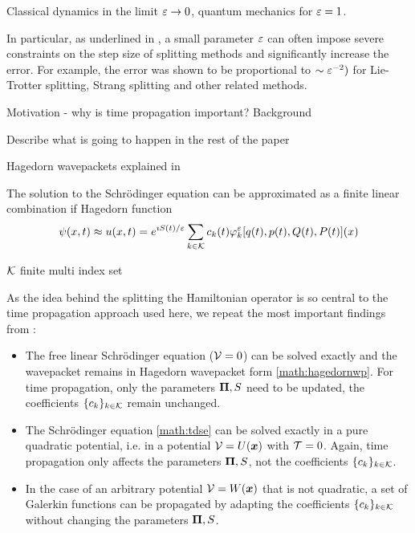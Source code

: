 Classical dynamics in the limit $\varepsilon \rightarrow 0$, quantum mechanics for $\varepsilon = 1$.

In particular, as underlined in \cite{GH_convsemiclassical}, a small parameter $\varepsilon$ can often impose severe constraints on the step size of splitting methods and significantly increase the error. For example, the error was shown to be proportional to $\sim \varepsilon^{-2})$ for Lie-Trotter splitting, Strang splitting and other related methods.

Motivation - why is time propagation important?
Background

Describe what is going to happen in the rest of the paper


Hagedorn wavepackets explained in \cite{FGL_semiclassical_dynamics}

The solution to the Schrödinger equation can be approximated as a finite linear combination if Hagedorn function \cite{FGL_semiclassical_dynamics}
\begin{align}
	\label{math:hagedornwp}
	\psi(x,t) \approx u(x,t)
	= e^{\imath S(t)/\varepsilon} \sum_{k \in \mathcal{K}} c_k(t) \varphi_k^{\varepsilon} [ q(t),p(t),Q(t),P(t) ] (x)
\end{align}

$\mathcal{K}$ finite multi index set

As the idea behind the splitting the Hamiltonian operator is so central to the time propagation approach used here, we repeat the most important findings from  \cite{FGL_semiclassical_dynamics}:
\begin{itemize}
	\item The free linear Schrödinger equation ($\mathcal{V}=0$) can be solved exactly and the wavepacket remains in Hagedorn wavepacket form \ref{math:hagedornwp}.
		For time propagation, only the parameters $\bm{\Pi},S$ need to be updated, the coefficients $\{c_k\}_{k \in \mathcal{K}}$ remain unchanged.
	\item The Schrödinger equation \ref{math:tdse} can be solved exactly in a pure quadratic potential, i.e. in a potential $\mathcal{V}=U(\bm{x})$ with $\mathcal{T}=0$.
		Again, time propagation only affects the parameters $\bm{\Pi},S$, not the coefficients $\{c_k\}_{k \in \mathcal{K}}$.
	\item In the case of an arbitrary potential $\mathcal{V} = W(\bm{x})$ that is not quadratic, a set of Galerkin functions can be propagated by adapting the coefficients $\{c_k\}_{k \in \mathcal{K}}$ without changing the parameters $\bm{\Pi},S$.
\end{itemize}

